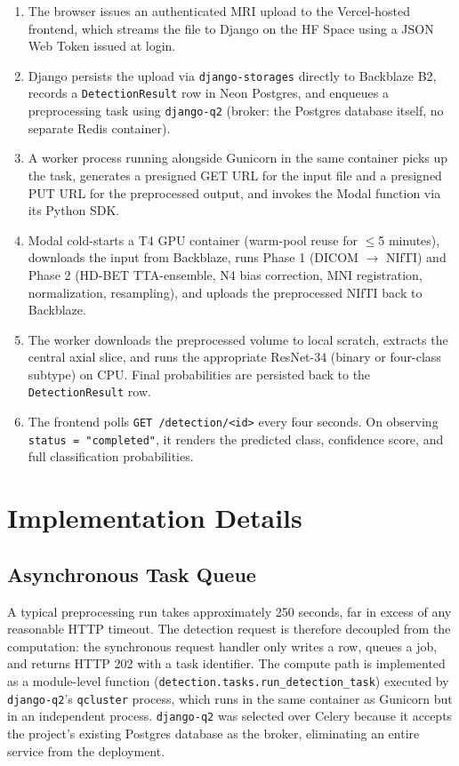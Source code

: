 \documentclass[11pt, a4paper]{article}
\begin{document}
\begin{enumerate}
    \item The browser issues an authenticated MRI upload to the Vercel-hosted frontend, which streams the file to Django on the HF Space using a JSON Web Token issued at login.
    \item Django persists the upload via \texttt{django-storages} directly to Backblaze B2, records a \texttt{DetectionResult} row in Neon Postgres, and enqueues a preprocessing task using \texttt{django-q2} (broker: the Postgres database itself, no separate Redis container).
    \item A worker process running alongside Gunicorn in the same container picks up the task, generates a presigned GET URL for the input file and a presigned PUT URL for the preprocessed output, and invokes the Modal function via its Python SDK.
    \item Modal cold-starts a T4 GPU container (warm-pool reuse for $\le$5 minutes), downloads the input from Backblaze, runs Phase 1 (DICOM $\rightarrow$ NIfTI) and Phase 2 (HD-BET TTA-ensemble, N4 bias correction, MNI registration, normalization, resampling), and uploads the preprocessed NIfTI back to Backblaze.
    \item The worker downloads the preprocessed volume to local scratch, extracts the central axial slice, and runs the appropriate ResNet-34 (binary or four-class subtype) on CPU. Final probabilities are persisted back to the \texttt{DetectionResult} row.
    \item The frontend polls \texttt{GET /detection/<id>} every four seconds. On observing \texttt{status = "completed"}, it renders the predicted class, confidence score, and full classification probabilities.
\end{enumerate}

\section{Implementation Details}

\subsection{Asynchronous Task Queue}

A typical preprocessing run takes approximately 250 seconds, far in excess of any reasonable HTTP timeout. The detection request is therefore decoupled from the computation: the synchronous request handler only writes a row, queues a job, and returns HTTP 202 with a task identifier. The compute path is implemented as a module-level function (\texttt{detection.tasks.run\_detection\_task}) executed by \texttt{django-q2}'s \texttt{qcluster} process, which runs in the same container as Gunicorn but in an independent process. \texttt{django-q2} was selected over Celery because it accepts the project's existing Postgres database as the broker, eliminating an entire service from the deployment.
\end{document}
